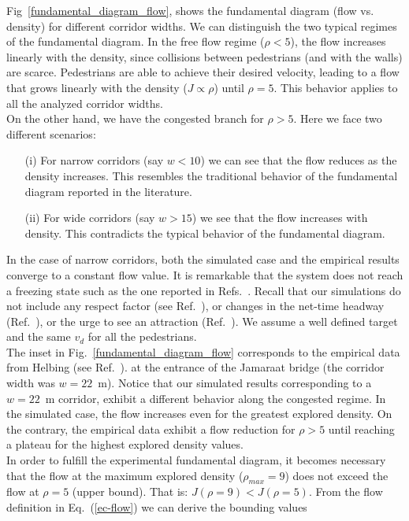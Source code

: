 \documentclass[preprint,12pt]{elsarticle}
\begin{document}
Fig~\ref{fundamental_diagram_flow}, shows the fundamental diagram (flow vs. density) for different corridor widths. We can distinguish the two typical regimes of the fundamental diagram. In the free flow regime ($\rho < 5$), the flow increases linearly with the density, since collisions between pedestrians (and with the walls) are scarce. Pedestrians are able to achieve their desired velocity, leading to a flow that grows linearly with the density ($J \propto \rho$) until $\rho=5$. This behavior applies to all the analyzed corridor widths.\\

On the other hand, we have the congested branch  for $\rho > 5$. Here we face two different scenarios:

\begin{itemize}
\item[(i)] For narrow corridors (say $w < 10$) we can see that the flow reduces as the density increases. This resembles the traditional behavior of the fundamental diagram reported in the literature. 
\item[(ii)] For wide corridors (say $w > 15$) we see that the flow increases with density. This contradicts the typical behavior of the fundamental diagram.   
\end{itemize}

In the case of narrow corridors, both the simulated case and the empirical results converge to a constant flow value. It is remarkable that the system does not reach a freezing state such as the one reported in Refs.~\cite{kwak,lin}. Recall that our simulations do not include any respect factor (see Ref.~\cite{parisi2}), or changes in the net-time headway (Ref.~\cite{helbing3}), or the urge to see an attraction (Ref.~\cite{kwak}). We assume a well defined target and the same $v_d$ for all the pedestrians.\\

The inset in Fig.~\ref{fundamental_diagram_flow} corresponds to the empirical data from Helbing (see Ref.~\cite{helbing3}). at the entrance of the Jamaraat bridge (the corridor width was $w=22$~m). Notice that our simulated results corresponding to a $w=22$~m corridor, exhibit a different behavior along the congested regime. In the simulated case, the flow increases even for the greatest explored density. On the contrary, the empirical data exhibit a flow reduction for $\rho > 5$ until reaching a plateau for the highest explored density values.  \\

In order to fulfill the experimental fundamental diagram, it becomes necessary that the flow at the maximum explored density ($\rho_{max} = 9$) does not exceed the flow at $\rho = 5$ (upper bound). That is:  $J(\rho = 9) < J(\rho = 5)$. From the flow definition in Eq.~(\ref{ec-flow}) we can derive the bounding values
\end{document}

